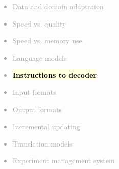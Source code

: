 \documentclass[landscape]{uedslides2C}
\newcommand{\currenttopic}[1]{\colorbox{lightyellow}{\textcolor{black}{\bf #1}}}
\begin{document}
%
%  
%	
%
%	
%	
%   
%
%
%
%
%
%
%			 



\vspace{-10mm}
\textcolor{darkgrey}{
\begin{itemize} \itemsep -1mm
\item Data and domain adaptation
\item Speed vs. quality
\item Speed vs. memory use
\item Language models
\item \currenttopic{Instructions to decoder}
\item Input formats
\item Output formats
\item Incremental updating
\item Translation models
\item Experiment management system
\end{itemize}
}
\end{document}
